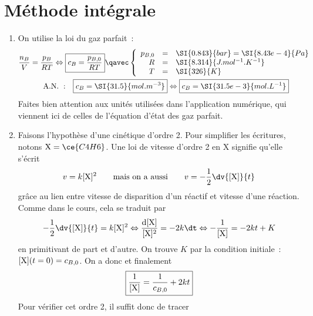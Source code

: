 \documentclass[a4paper, 12pt, final, garamond]{book}
\begin{document}
\section{Méthode intégrale}
\begin{enumerate}
    \item On utilise la loi du gaz parfait~:
        \begin{gather*}
            \frac{n_B}{V} = \frac{p_B}{RT}
            \Leftrightarrow
            \boxed{c_B = \frac{p_{B,0}}{RT}}
            \qavec
            \left\{
                \begin{array}{rcl}
                    p_{B,0} & = & \SI{0.843}{bar} = \SI{8.43e-4}{Pa}\\
                    R & = & \SI{8.314}{J.mol^{-1}.K^{-1}}\\
                    T & = & \SI{326}{K}
                \end{array}
            \right.\\
            \mathrm{A.N.~:}\quad
            \boxed{c_B = \SI{31.5}{mol.m^{-3}}}
            \Leftrightarrow
            \boxed{c_B = \SI{31.5e-3}{mol.L^{-1}}}
        \end{gather*}
        Faites bien attention aux unités utilisées dans l'application numérique,
        qui viennent ici de celles de l'équation d'état des gaz parfait.
    \item Faisons l'hypothèse d'une cinétique d'ordre 2. Pour simplifier les
        écritures, notons ${\rm X} = \ce{C4H6}$. Une loi de vitesse d'ordre 2 en
        X signifie qu'elle s'écrit
        \[
            v = k[{\rm X}]^2
            \qquad\text{mais on a aussi}\qquad
            v = - \frac{1}{2} \dv{[{\rm X}]}{t}
        \]
        grâce au lien entre vitesse de disparition d'un réactif et vitesse d'une
        réaction. Comme dans le cours, cela se traduit par
        \begin{gather*}
            - \frac{1}{2} \dv{[{\rm X}]}{t} = k[{\rm X}]^2 
            \Leftrightarrow
            \frac{\mathrm{d} [{\rm X}]}{[{\rm X}]^2} = -2k\dt
            \Leftrightarrow
            - \frac{1}{[{\rm X}]} = -2kt + K
        \end{gather*}
        en primitivant de part et d'autre. On trouve $K$ par la condition
        initiale~: $[{\rm X}](t=0) = c_{B,0}$. On a donc 
        et finalement
        \[\boxed{ \frac{1}{[{\rm X}]} = \frac{1}{c_{B,0}} + 2kt}\]
        Pour vérifier cet ordre 2, il suffit donc de tracer


\end{enumerate}
\end{document}
